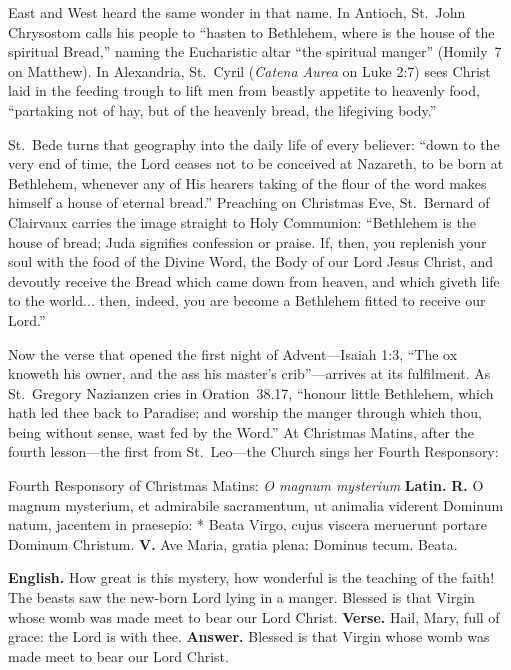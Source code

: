 East and West heard the same wonder in that name. In Antioch, St.~John
Chrysostom calls his people to ``hasten to Bethlehem, where is the house of the
spiritual Bread,'' naming the Eucharistic altar ``the spiritual manger''
(Homily~7 on Matthew). In Alexandria, St.~Cyril (\textit{Catena Aurea} on Luke
2:7) sees Christ laid in the feeding trough to lift men from beastly appetite
to heavenly food, ``partaking not of hay, but of the heavenly bread, the
lifegiving body.''

St.~Bede turns that geography into the daily life of every believer: ``down to
the very end of time, the Lord ceases not to be conceived at Nazareth, to be
born at Bethlehem, whenever any of His hearers taking of the flour of the word
makes himself a house of eternal bread.'' Preaching on Christmas Eve,
St.~Bernard of Clairvaux carries the image straight to Holy Communion:
``Bethlehem is the house of bread; Juda signifies confession or praise. If,
then, you replenish your soul with the food of the Divine Word, the Body of our
Lord Jesus Christ, and devoutly receive the Bread which came down from heaven,
and which giveth life to the world... then, indeed, you are become a Bethlehem
fitted to receive our Lord.''

Now the verse that opened the first night of Advent---Isaiah 1:3, ``The ox
knoweth his owner, and the ass his master's crib''---arrives at its
fulfilment. As St.~Gregory Nazianzen cries in Oration~38.17, ``honour little
Bethlehem, which hath led thee back to Paradise; and worship the manger through
which thou, being without sense, wast fed by the Word.'' At Christmas Matins,
after the fourth lesson---the first from St.~Leo---the Church sings her Fourth
Responsory:

\begin{massbox}{Fourth Responsory of Christmas Matins: \textit{O magnum mysterium}}
\textbf{Latin.} \textbf{R.} O magnum mysterium, et admirabile sacramentum, ut
animalia viderent Dominum natum, jacentem in praesepio: * Beata Virgo, cujus
viscera meruerunt portare Dominum Christum. \textbf{V.} Ave Maria, gratia
plena: Dominus tecum. Beata.

\textbf{English.} How great is this mystery, how wonderful is the teaching of
the faith! The beasts saw the new-born Lord lying in a manger. Blessed is that
Virgin whose womb was made meet to bear our Lord Christ. \textbf{Verse.} Hail,
Mary, full of grace: the Lord is with thee. \textbf{Answer.} Blessed is that
Virgin whose womb was made meet to bear our Lord Christ.
\end{massbox}

